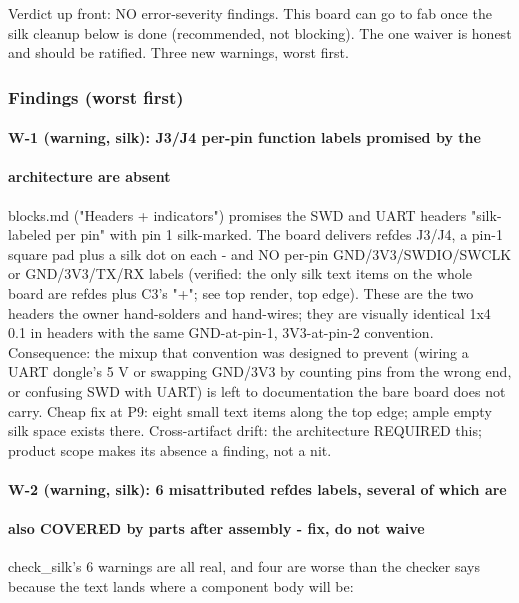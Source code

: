 \documentclass[11pt,a4paper]{article}
\begin{document}
Verdict up front: NO error-severity findings. This board can go to fab once the silk cleanup below is done (recommended, not blocking). The one waiver is honest and should be ratified. Three new warnings, worst first.

\subsubsection*{Findings (worst first)}
\paragraph*{W-1 (warning, silk): J3/J4 per-pin function labels promised by the}
\paragraph*{architecture are absent}
blocks.md ("Headers + indicators") promises the SWD and UART headers "silk-labeled per pin" with pin 1 silk-marked. The board delivers refdes J3/J4, a pin-1 square pad plus a silk dot on each - and NO per-pin GND/3V3/SWDIO/SWCLK or GND/3V3/TX/RX labels (verified: the only silk text items on the whole board are refdes plus C3's "+"; see top render, top edge). These are the two headers the owner hand-solders and hand-wires; they are visually identical 1x4 0.1 in headers with the same GND-at-pin-1, 3V3-at-pin-2 convention. Consequence: the mixup that convention was designed to prevent (wiring a UART dongle's 5 V or swapping GND/3V3 by counting pins from the wrong end, or confusing SWD with UART) is left to documentation the bare board does not carry. Cheap fix at P9: eight small text items along the top edge; ample empty silk space exists there. Cross-artifact drift: the architecture REQUIRED this; product scope makes its absence a finding, not a nit.

\paragraph*{W-2 (warning, silk): 6 misattributed refdes labels, several of which are}
\paragraph*{also COVERED by parts after assembly - fix, do not waive}
check\_silk's 6 warnings are all real, and four are worse than the checker says because the text lands where a component body will be:
\end{document}
